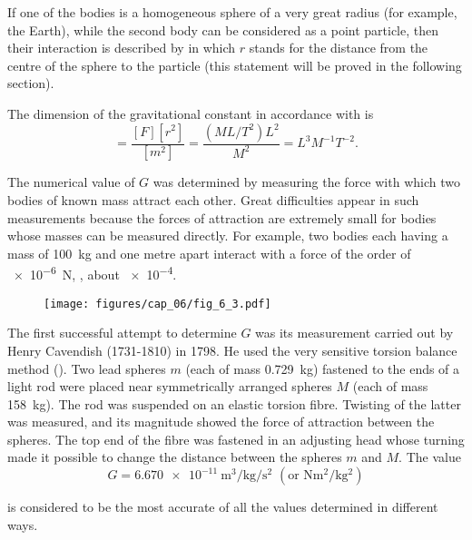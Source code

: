 If one of the bodies is a homogeneous sphere of a very great radius (for example, the Earth), while the second body can be considered as a point particle, then their interaction is described by  in which $r$ stands for the distance from the centre of the sphere to the particle (this statement will be proved in the following section).

The dimension of the gravitational constant in accordance with  is
\begin{equation*}
	[G] = \frac{[F][r^2]}{[m^2]} = \frac{(ML/T^2)L^2}{M^2} = L^3M^{-1}T^{-2}.
\end{equation*}

\noindent
The numerical value of $G$ was determined by measuring the force with which two bodies of known mass attract each other. Great difficulties appear in such measurements because the forces of attraction are extremely small for bodies whose masses can be measured directly. For example, two bodies each having a mass of \SI{100}{\kilo\gram} and one metre apart interact with a force of the order of \SI{e-6}{\newton}, \ie, about \SI{e-4}{\gf}.

\begin{figure}[t]
	\begin{center}
		\texttt{[image: figures/cap\_06/fig\_6\_3.pdf]}
		\caption[]{}
		\label{fig:6_3}
	\end{center}
\vspace{-0.7cm}
\end{figure}

The first successful attempt to determine $G$ was its measurement carried out by Henry Cavendish (1731-1810) in 1798. He used the very sensitive torsion balance method (). Two lead spheres $m$ (each of mass \SI{0.729}{\kilo\gram}) fastened to the ends of a light rod were placed near symmetrically arranged spheres $M$ (each of mass \SI{158}{\kilo\gram}). The rod was suspended on an elastic torsion fibre. Twisting of the latter was measured, and its magnitude showed the force of attraction between the spheres. The top end of the fibre was fastened in an adjusting head whose turning made it possible to change the distance between the spheres $m$ and $M$. The value
\begin{equation*}
	G = \SI{6.670e-11}{\metre\cubed\per\kilo\gram\per\second\squared}\,\,(\text{or}\,\, \si{\newton\metre\squared\per\kilo\gram\squared})
\end{equation*}

\noindent
is considered to be the most accurate of all the values determined in different ways.

